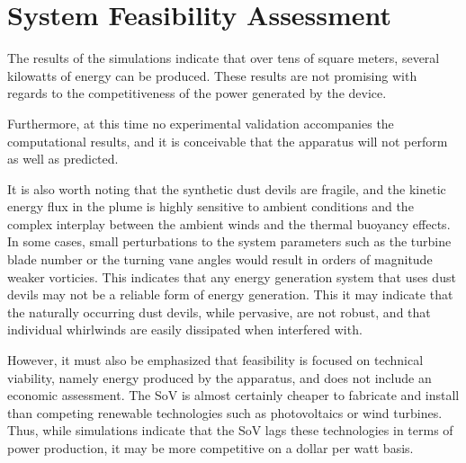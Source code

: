 %
%
\section{System Feasibility Assessment}

The results of the simulations indicate that over tens of square meters,
several kilowatts of energy can be produced. These results are not
promising with regards to the competitiveness of the power generated by
the device. 

Furthermore, at this time no experimental validation accompanies the
computational results, and it is conceivable that the apparatus will not
perform as well as predicted.  

It is also worth noting that the synthetic dust devils are fragile, and
the kinetic energy flux in the plume is highly sensitive to ambient
conditions and the complex interplay between the ambient winds and the
thermal buoyancy effects. In some cases, small perturbations to the
system parameters such as the turbine blade number or the turning vane
angles would result in orders of magnitude weaker vorticies. 
This indicates that any energy generation system that uses dust
devils may not be a reliable form of energy generation. This it
may indicate that the naturally occurring dust devils, while pervasive,
are not robust, and that individual whirlwinds are easily dissipated
when interfered with. 

However, it must also be emphasized that feasibility is focused on
technical viability, namely energy produced by the apparatus, and does
not include an economic assessment. The SoV is almost certainly cheaper
to fabricate and install than competing renewable technologies such as
photovoltaics or wind turbines. Thus, while simulations indicate that
the SoV lags these technologies in terms of power production, it may be
more competitive on a dollar per watt basis. 




